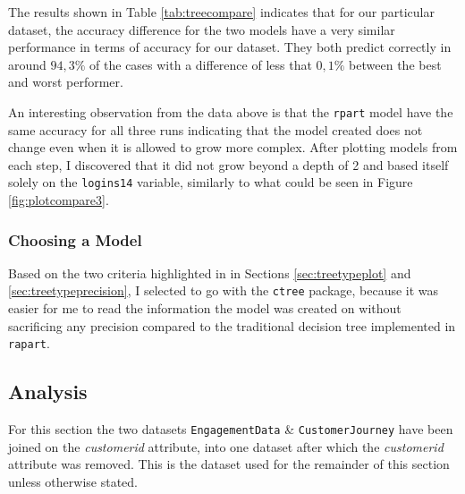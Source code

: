 The results shown in Table \ref{tab:treecompare} indicates that for our
particular dataset, the accuracy difference for the two models have a very
similar performance in terms of accuracy for our dataset. They both predict
correctly in around $94,3\%$ of the cases with a difference of less that
$0,1\%$ between the best and worst performer.

An interesting observation from the data above is that the \texttt{rpart} model
have the same accuracy for all three runs indicating that the model created does
not change even when it is allowed to grow more complex. After plotting models
from each step, I discovered that it did not grow beyond a depth of 2 and based
itself solely on the \texttt{logins14} variable, similarly to what could be seen
in Figure \ref{fig:plotcompare3}.


\subsubsection{Choosing a Model}

Based on the two criteria highlighted in in Sections \ref{sec:treetypeplot} and
\ref{sec:treetypeprecision}, I selected to go with the \texttt{ctree} package,
because it was easier for me to read the information the model was created on
without sacrificing any precision compared to the traditional decision tree
implemented in \texttt{rapart}.


\subsection{Analysis}

For this section the two datasets \texttt{EngagementData} \&
\texttt{CustomerJourney} have been joined on the \textit{customerid} attribute,
into one dataset after which the \textit{customerid} attribute was removed. This
is the dataset used for the remainder of this section unless otherwise stated.



